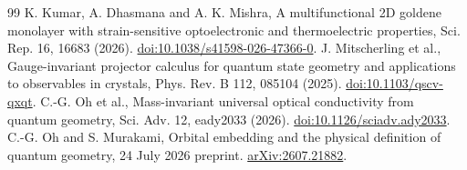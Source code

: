 \documentclass[11pt]{article}
\begin{document}
\begin{thebibliography}{99}
 K. Kumar, A. Dhasmana and A. K. Mishra, A multifunctional 2D goldene monolayer with strain-sensitive optoelectronic and thermoelectric properties, Sci. Rep. 16, 16683 (2026). \href{https://doi.org/10.1038/s41598-026-47366-0}{doi:10.1038/s41598-026-47366-0}.
 J. Mitscherling et al., Gauge-invariant projector calculus for quantum state geometry and applications to observables in crystals, Phys. Rev. B 112, 085104 (2025). \href{https://doi.org/10.1103/qscv-qxqt}{doi:10.1103/qscv-qxqt}.
 C.-G. Oh et al., Mass-invariant universal optical conductivity from quantum geometry, Sci. Adv. 12, eady2033 (2026). \href{https://doi.org/10.1126/sciadv.ady2033}{doi:10.1126/sciadv.ady2033}.
 C.-G. Oh and S. Murakami, Orbital embedding and the physical definition of quantum geometry, 24 July 2026 preprint. \href{https://arxiv.org/abs/2607.21882}{arXiv:2607.21882}.
\end{thebibliography}
\end{document}
